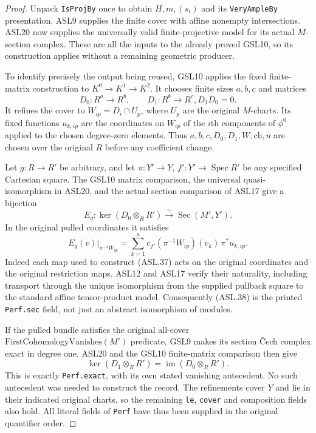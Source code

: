 \begin{proof}
Unpack \texttt{Is\allowbreak{}Proj\allowbreak{}By} once to obtain $H,m,(s_i)$ and its
\texttt{Very\allowbreak{}Ample\allowbreak{}By} presentation.  ASL9 supplies the finite
cover with affine nonempty intersections.  ASL20 now supplies
the universally valid finite-projective model for its actual
$M$-section complex.  These are all the inputs to the already
proved GSL10, so its construction applies without a remaining
geometric producer.

To identify precisely the output being reused, GSL10 applies
the fixed finite-matrix construction to $K^0\to K^1\to K^2$.
It chooses finite sizes $a,b,c$ and matrices
\[
 D_0:R^a\to R^b,\qquad D_1:R^b\to R^c,
                         D_1D_0=0.                  \tag{ASL.36}
\]
It refines the cover to $W_{ip}=D_i\cap U_p$, where $U_p$
are the original $M$-charts.  Its fixed functions $u_{k,ip}$
are the coordinates on $W_{ip}$ of the $i$th components
of $\phi^0$ applied to the chosen degree-zero elements.
Thus $a,b,c,D_0,D_1,W,\mathrm{ch},u$ are chosen over the
original $R$ before any coefficient change.

Let $g:R\to R'$ be arbitrary, and let
$\pi:Y'\to Y$, $f':Y'\to\operatorname{Spec}R'$ be any
specified Cartesian square.  The GSL10 matrix comparison,
the universal quasi-isomorphism in ASL20, and the actual
section comparison of ASL17 give a bijection
\[
 E_g:\ker(D_0\otimes_RR')
                       \xrightarrow{\ \sim\ }\operatorname{Sec}(M',Y').
                                                        \tag{ASL.37}
\]
In the original pulled coordinates it satisfies
\[
 E_g(v)|_{\pi^{-1}W_{ip}}
       =\sum_{k=1}^{a}c_{f'}(\pi^{-1}W_{ip})(v_k)
                                          \,\pi^*u_{k,ip}.
                                                        \tag{ASL.38}
\]
Indeed each map used to construct (ASL.37) acts on the
original coordinates and the original restriction maps.
ASL12 and ASL17 verify their naturality, including transport
through the unique isomorphism from the supplied pullback
square to the standard affine tensor-product model.
Consequently (ASL.38) is the printed \texttt{Perf.sec} field,
not just an abstract isomorphism of modules.

If the pulled bundle satisfies the original all-cover
$\mathrm{FirstCohomologyVanishes}(M')$ predicate, GSL9
makes its section \v Cech complex exact in degree one.
ASL20 and the GSL10 finite-matrix comparison then give
\[
 \ker(D_1\otimes_RR')=\operatorname{im}(D_0\otimes_RR').
                                                        \tag{ASL.39}
\]
This is exactly \texttt{Perf.exact}, with its own stated
vanishing antecedent.  No such antecedent was needed to
construct the record.  The refinements cover $Y$ and lie
in their indicated original charts, so the remaining
\texttt{le}, \texttt{cover} and composition fields also hold.
All literal fields of \texttt{Perf} have thus been supplied
in the original quantifier order.
\end{proof}

